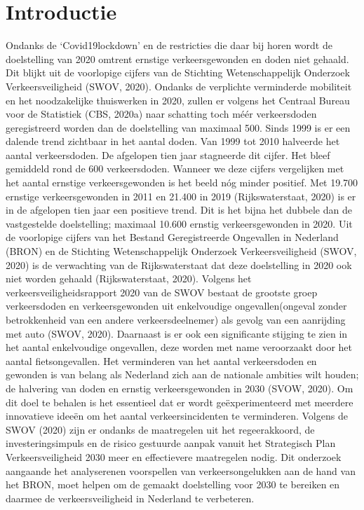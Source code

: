 \documentclass[letterpaper,10pt,english]{jupyterBook}
\begin{document}
\chapter{Introductie}
\label{\detokenize{introductie:introductie}}\label{\detokenize{introductie::doc}}
\sphinxAtStartPar
Ondanks de ‘Covid\sphinxhyphen{}19\sphinxhyphen{}lockdown’ en de restricties die daar bij horen wordt de doelstelling van 2020 omtrent ernstige verkeersgewonden en doden niet gehaald. Dit blijkt uit de voorlopige cijfers van de Stichting Wetenschappelijk Onderzoek Verkeersveiligheid (SWOV, 2020). Ondanks de verplichte verminderde mobiliteit en het noodzakelijke thuiswerken in 2020, zullen er volgens het Centraal Bureau voor de Statistiek (CBS, 2020a) naar schatting toch méér verkeersdoden geregistreerd worden dan de doelstelling van maximaal 500.
Sinds 1999 is er een dalende trend zichtbaar in het aantal doden. Van 1999 tot 2010 halveerde het aantal verkeersdoden. De afgelopen tien jaar stagneerde dit cijfer. Het bleef gemiddeld rond de 600 verkeersdoden. Wanneer we deze cijfers vergelijken met het aantal ernstige verkeersgewonden is het beeld nóg minder positief. Met 19.700 ernstige verkeersgewonden in 2011 en 21.400 in 2019 (Rijkswaterstaat, 2020) is er in de afgelopen tien jaar een positieve trend. Dit is het bijna het dubbele dan de vastgestelde doelstelling; maximaal 10.600 ernstig verkeersgewonden in 2020. Uit de voorlopige cijfers van het Bestand Geregistreerde Ongevallen in Nederland (BRON) en de Stichting Wetenschappelijk Onderzoek Verkeersveiligheid (SWOV, 2020) is de verwachting van de Rijkswaterstaat dat deze doelstelling in 2020 ook niet worden gehaald (Rijkswaterstaat, 2020).
Volgens het verkeersveiligheidsrapport 2020 van de SWOV bestaat de grootste groep verkeersdoden en verkeersgewonden uit enkelvoudige ongevallen(ongeval zonder betrokkenheid van een andere verkeersdeelnemer) als gevolg van een aanrijding met auto (SWOV, 2020). Daarnaast is er ook een significante stijging te zien in het aantal enkelvoudige ongevallen, deze worden met name veroorzaakt door het aantal fietsongevallen.
Het verminderen van het aantal verkeersdoden en gewonden is van belang als Nederland zich aan de nationale ambities wilt houden; de halvering van doden en ernstig verkeersgewonden in 2030 (SVOW, 2020). Om dit doel te behalen is het essentieel dat er wordt geëxperimenteerd met meerdere innovatieve ideeën om het aantal verkeersincidenten te verminderen. Volgens de SWOV (2020) zijn er ondanks de maatregelen uit het regeerakkoord, de investeringsimpuls en de risico gestuurde aanpak vanuit het Strategisch Plan Verkeersveiligheid 2030 meer en effectievere maatregelen nodig. Dit onderzoek aangaande het analyseren\sphinxhyphen{}en voorspellen van verkeersongelukken aan de hand van het BRON, moet helpen om de gemaakt doelstelling voor 2030 te bereiken en daarmee de verkeersveiligheid in Nederland te verbeteren.
\end{document}
